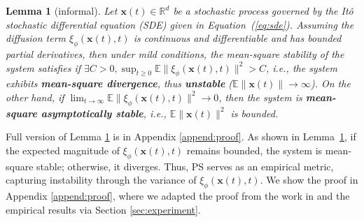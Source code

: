 \documentclass{article} %
\newtheorem{lem}{Lemma}
\begin{document}
\begin{lem}[informal]\label{lem:stability}
    Let $\mathbf x(t) \in \mathbb R^d$ be a stochastic process governed by the Itô stochastic differential equation (SDE) given in Equation~(\ref{eq:sde}). Assuming
    the diffusion term \( \xi_{\phi}(\mathbf{x}(t), t) \) is continuous and differentiable and has bounded partial derivatives, 
    then under mild conditions, the mean-square stability of the system satisfies if $\exists C > 0, \sup_{t \geq 0} \mathbb{E} \|\xi_{\phi}(\mathbf{x}(t), t)\|^2 > C$, i.e., the system exhibits \textbf{mean-square divergence}, thus \textbf{unstable} ($\mathbb E \|\mathbf x(t)\| \rightarrow \infty$). On the other hand, if $\lim_{t \to \infty} \mathbb{E} \|\xi_{\phi}(\mathbf{x}(t), t)\|^2 \to 0$, then the system is \textbf{mean-square asymptotically stable}, i.e., $\mathbb E \|\mathbf x(t)\|^2$ is bounded. 
    \end{lem}

Full version of Lemma \ref{lem:stability} is in Appendix \ref{append:proof}. As shown in Lemma~\ref{lem:stability}, if the expected magnitude of $\xi_{\phi}(\mathbf{x}(t), t)$ remains bounded, the system is mean-square stable; otherwise, it diverges. Thus, PS serves as an empirical metric, capturing instability through the variance of $\xi_{\phi}(\mathbf{x}(t), t)$.
We show the proof in Appendix \ref{append:proof}, where we adapted the proof from the work in \citep{khasminskii2012stochastic} and the empirical results via Section \ref{sec:experiment}. 
\end{document}
